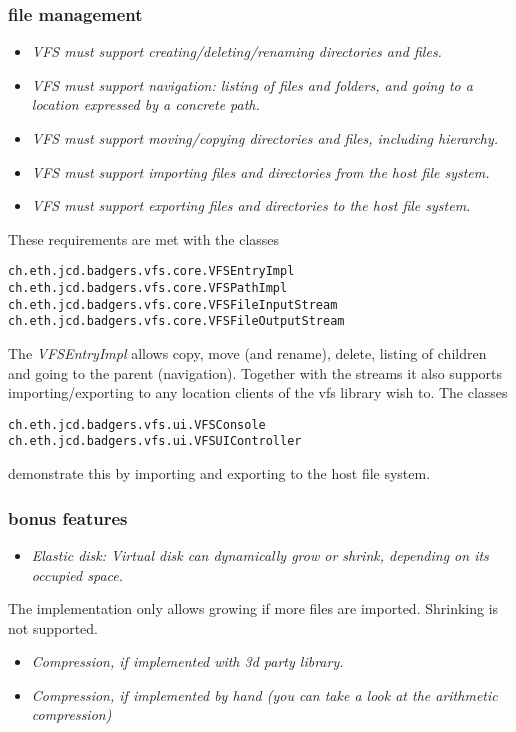 \subsubsection{file management}
\begin{itemize}
  \item \emph{VFS must support creating/deleting/renaming directories and files.}
  \item \emph{VFS must support navigation: listing of files and folders, and
  going to a location expressed by a concrete path.}
  \item \emph{VFS must support moving/copying directories and files, including
  hierarchy.}
  \item \emph{VFS must support importing files and directories from
  the host file system.}
  \item \emph{VFS must support exporting files and directories to the host file
  system.}
\end{itemize} These requirements are met with the classes
\begin{verbatim}
ch.eth.jcd.badgers.vfs.core.VFSEntryImpl
ch.eth.jcd.badgers.vfs.core.VFSPathImpl
ch.eth.jcd.badgers.vfs.core.VFSFileInputStream
ch.eth.jcd.badgers.vfs.core.VFSFileOutputStream
\end{verbatim}The \textit{VFSEntryImpl} allows
copy, move (and rename), delete, listing of children and going to the parent
(navigation). Together with the streams it also supports importing/exporting
to any location clients of the vfs library wish to. The classes
\begin{verbatim}
ch.eth.jcd.badgers.vfs.ui.VFSConsole
ch.eth.jcd.badgers.vfs.ui.VFSUIController
\end{verbatim} demonstrate this by importing and exporting to the host file
system.

\subsubsection {bonus features}
\begin{itemize}
  \item \emph{Elastic disk: Virtual disk can dynamically grow or shrink,
  depending on its occupied space.}
\end{itemize}
The implementation only allows growing if more files are imported. Shrinking is
not supported.

\begin{itemize}
  \item \emph{Compression, if implemented with 3d party library.}
  \item \emph{Compression, if implemented by hand (you can take a look at
  the arithmetic compression)}
\end{itemize}

